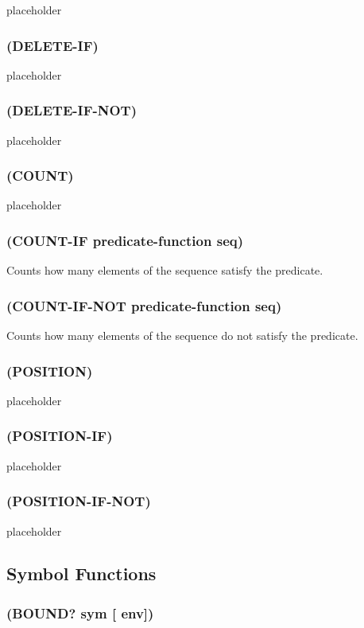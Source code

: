 \documentclass[11pt]{article}
\begin{document}
placeholder
\subsubsection{(DELETE-IF)}
\label{sec-4-15-27}

placeholder
\subsubsection{(DELETE-IF-NOT)}
\label{sec-4-15-28}

placeholder
\subsubsection{(COUNT)}
\label{sec-4-15-29}

placeholder
\subsubsection{(COUNT-IF predicate-function seq)}
\label{sec-4-15-30}

Counts how many elements of the sequence satisfy the predicate.
\subsubsection{(COUNT-IF-NOT predicate-function seq)}
\label{sec-4-15-31}

Counts how many elements of the sequence do not satisfy the predicate.
\subsubsection{(POSITION)}
\label{sec-4-15-32}

placeholder
\subsubsection{(POSITION-IF)}
\label{sec-4-15-33}

placeholder
\subsubsection{(POSITION-IF-NOT)}
\label{sec-4-15-34}

placeholder
\subsection{Symbol Functions}
\label{sec-4-16}

\subsubsection{(BOUND? sym [ env])}
\label{sec-4-16-1}
\end{document}
